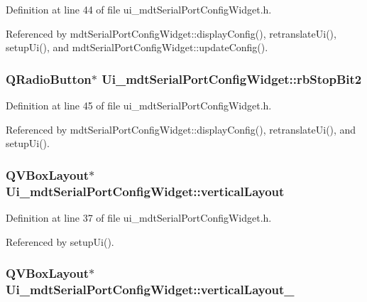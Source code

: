 Definition at line 44 of file ui\-\_\-mdt\-Serial\-Port\-Config\-Widget.\-h.



Referenced by mdt\-Serial\-Port\-Config\-Widget\-::display\-Config(), retranslate\-Ui(), setup\-Ui(), and mdt\-Serial\-Port\-Config\-Widget\-::update\-Config().

\hypertarget{class_ui__mdt_serial_port_config_widget_a3cb2aaaf47c7aad387d4a81a5f0e963b}{
\subsubsection[{rb\-Stop\-Bit2}]{\setlength{\rightskip}{0pt plus 5cm}Q\-Radio\-Button$\ast$ Ui\-\_\-mdt\-Serial\-Port\-Config\-Widget\-::rb\-Stop\-Bit2}}\label{class_ui__mdt_serial_port_config_widget_a3cb2aaaf47c7aad387d4a81a5f0e963b}


Definition at line 45 of file ui\-\_\-mdt\-Serial\-Port\-Config\-Widget.\-h.



Referenced by mdt\-Serial\-Port\-Config\-Widget\-::display\-Config(), retranslate\-Ui(), and setup\-Ui().

\hypertarget{class_ui__mdt_serial_port_config_widget_a1405ab1f15dea4e2e676a0e88c6f8ea2}{
\subsubsection[{vertical\-Layout}]{\setlength{\rightskip}{0pt plus 5cm}Q\-V\-Box\-Layout$\ast$ Ui\-\_\-mdt\-Serial\-Port\-Config\-Widget\-::vertical\-Layout}}\label{class_ui__mdt_serial_port_config_widget_a1405ab1f15dea4e2e676a0e88c6f8ea2}


Definition at line 37 of file ui\-\_\-mdt\-Serial\-Port\-Config\-Widget.\-h.



Referenced by setup\-Ui().

\hypertarget{class_ui__mdt_serial_port_config_widget_a3d89ec4551628302696f5a2b85e42361}{
\subsubsection[{vertical\-Layout\-\_\-2}]{\setlength{\rightskip}{0pt plus 5cm}Q\-V\-Box\-Layout$\ast$ Ui\-\_\-mdt\-Serial\-Port\-Config\-Widget\-::vertical\-Layout\-\_}}\label{class_ui__mdt_serial_port_config_widget_a3d89ec4551628302696f5a2b85e42361}


